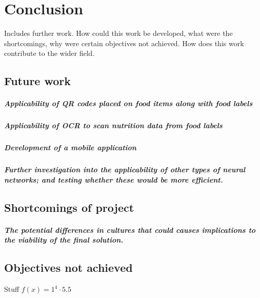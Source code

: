 \documentclass[11pt]{article}
\begin{document}
\section{Conclusion}
Includes further work. How could this work be developed, what were the shortcomings, why were certain objectives not achieved. How does this work contribute to the wider field.
	\subsection{Future work}
		\subparagraph{Applicability of QR codes placed on food items along with food 				labels}
		\subparagraph{Applicability of OCR to scan nutrition data from food labels}
		\subparagraph{Development of a mobile application}
		\subparagraph{Further investigation into the applicability of other types of neural networks; and testing whether these would be more efficient.}
	\subsection{Shortcomings of project}
		\subparagraph{The potential differences in cultures that could causes implications to the viability of the final solution.}
		\subparagraph{}
	\subsection{Objectives not achieved}
	Stuff
	$f(x)=1^4\cdot5.5$
\pagebreak

\end{document}
